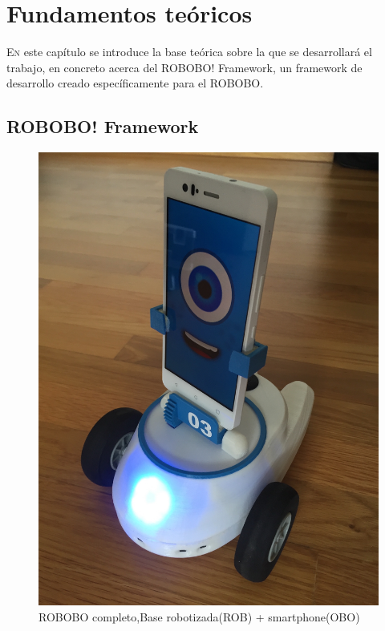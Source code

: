 \chapter{Fundamentos teóricos}
\label{chap:fundamentos-teoricos}
\vspace{0.5cm}



\lettrine{E}{n} este capítulo se introduce la base teórica sobre la que se desarrollará el trabajo, en concreto acerca del ROBOBO! Framework, un framework de desarrollo creado específicamente para el ROBOBO.



\section{ROBOBO! Framework}
\label{sec:robobo-framework}


\begin{figure}%
	\centering
	\includegraphics[width=0.5\linewidth]{imagenes/rob_obo.JPG}
	\caption{ROBOBO completo,Base robotizada(ROB) + smartphone(OBO)}
	\label{fig:rob_obo}
\end{figure}

